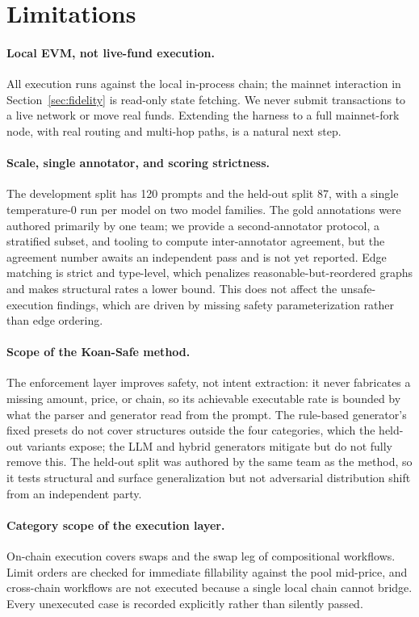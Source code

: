 \section{Limitations}
\label{sec:limitations}

\paragraph{Local EVM, not live-fund execution.} All execution runs
against the local in-process chain; the mainnet interaction in
Section~\ref{sec:fidelity} is read-only state fetching. We never submit
transactions to a live network or move real funds. Extending the harness
to a full mainnet-fork node, with real routing and multi-hop paths, is a
natural next step.

\paragraph{Scale, single annotator, and scoring strictness.} The
development split has 120 prompts and the held-out split 87, with a
single temperature-$0$ run per model on two model families. The gold
annotations were authored primarily by one team; we provide a
second-annotator protocol, a stratified subset, and tooling to compute
inter-annotator agreement, but the agreement number awaits an independent
pass and is not yet reported. Edge matching is strict and type-level,
which penalizes reasonable-but-reordered graphs and makes structural
rates a lower bound. This does not affect the unsafe-execution findings,
which are driven by missing safety parameterization rather than edge
ordering.

\paragraph{Scope of the Koan-Safe method.} The enforcement layer improves
safety, not intent extraction: it never fabricates a missing amount,
price, or chain, so its achievable executable rate is bounded by what the
parser and generator read from the prompt. The rule-based generator's
fixed presets do not cover structures outside the four categories, which
the held-out variants expose; the LLM and hybrid generators mitigate but
do not fully remove this. The held-out split was authored by the same
team as the method, so it tests structural and surface generalization but
not adversarial distribution shift from an independent party.

\paragraph{Category scope of the execution layer.} On-chain execution
covers swaps and the swap leg of compositional workflows. Limit orders
are checked for immediate fillability against the pool mid-price, and
cross-chain workflows are not executed because a single local chain
cannot bridge. Every unexecuted case is recorded explicitly rather than
silently passed.
